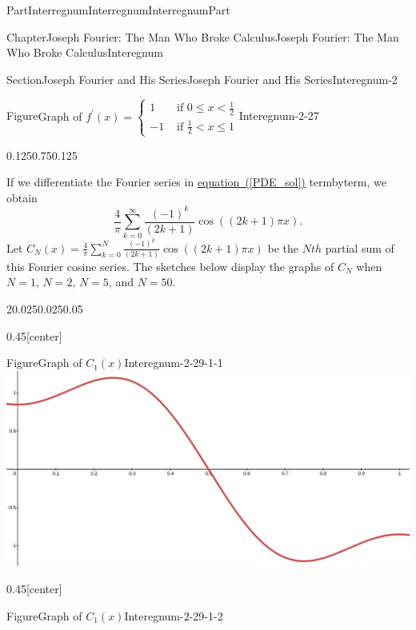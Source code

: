 \documentclass[oneside,10pt,]{book}
\newcommand{\xreffont}{\relax}
\numberwithin{equation}{part}
\newcommand{\lt}{<}
\newcommand{\amp}{&}
\begin{document}
\begin{partptx}{Part}{Interregnum}{}{Interregnum}{}{}{InterregnumPart}
\begin{chapterptx}{Chapter}{Joseph Fourier: The Man Who Broke Calculus}{}{Joseph Fourier: The Man Who Broke Calculus}{}{}{Interegnum}
\begin{sectionptx}{Section}{Joseph Fourier and His Series}{}{Joseph Fourier and His Series}{}{}{Interegnum-2}
\begin{figureptx}{Figure}{Graph of \(f^\prime(x) = 
\begin{cases}
1\amp \text{ if }  0\leq x\lt \frac{1}{2}\\ 
-1\amp \text{ if } \frac{1}{2}\lt x\leq 1 
\end{cases} \)}{Interegnum-2-27}{}
\begin{image}{0.125}{0.75}{0.125}{}
\end{image}%
\tcblower
\end{figureptx}%
If we differentiate the Fourier series in \hyperref[PDE_sol]{equation~({\xreffont\ref{PDE_sol}})} term\textendash{}by\textendash{}term, we obtain%
\begin{equation}
\frac{4}{\pi}\sum_{k=0}^\infty\frac{\left(-1\right)^k}{\left(2k+1\right)}
\cos\left(\left(2k+1\right)\pi x\right) \text{.}\label{EQUATIONPDESolDeriv}
\end{equation}
Let \(C_N(x)=\frac{4}{\pi}\sum_{k=0}^N\frac{\left(-1\right)^k}{\left(2k+1\right)}
\cos\left(\left(2k+1\right)\pi x\right)\) be the \(Nth\) partial sum of this Fourier cosine series. The sketches below display the graphs of \(C_N\) when \(N=1\), \(N=2\), \(N=5\), and \(N=50\).%
\begin{sidebyside}{2}{0.025}{0.025}{0.05}%
\begin{sbspanel}{0.45}[center]%
\begin{panelfigureptx}{Figure}{Graph of \(C_1(x)\)}{Interegnum-2-29-1-1}{}%
\noindent\includegraphics[width=\linewidth]{external/images/FourierEx6-1.png}
\tcblower
\end{panelfigureptx}%
\end{sbspanel}%
\begin{sbspanel}{0.45}[center]%
\begin{panelfigureptx}{Figure}{Graph of \(C_1(x)\)}{Interegnum-2-29-1-2}{}%

\end{panelfigureptx}
\end{sbspanel}
\end{sidebyside}
\end{sectionptx}
\end{chapterptx}
\end{partptx}
\end{document}
